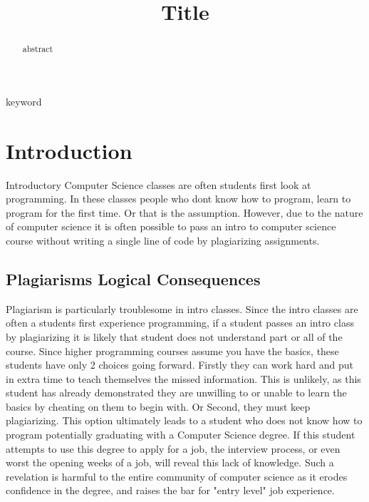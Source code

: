 \documentclass[conference]{IEEEtran}
\begin{document}
\makeatletter
\newlength{\logoheight}
\setlength{\logoheight}{50pt} %

    

\title{
    \textbf{Title}}

\author{
}

\maketitle

\begin{abstract}
abstract
\end{abstract}

\begin{IEEEkeywords}
keyword
\end{IEEEkeywords}

\section{\textbf{Introduction}}
	Introductory Computer Science classes are often students first look at programming.  In these classes people who dont know how to program, learn to program for the first time.  Or that is the assumption.  However, due to the nature of computer science it is often possible to pass an intro to computer science course without writing a single line of code by plagiarizing assignments.
	\subsection{Plagiarisms Logical Consequences}
		Plagiarism is particularly troublesome in intro classes.  Since the intro classes are often a students first experience programming, if a student passes an intro class by plagiarizing it is likely that student does not understand part or all of the course.  Since higher programming courses assume you have the basics, these students have only 2 choices going forward.  Firstly they can work hard and put in extra time to teach themselves the missed information.  This is unlikely, as this student has already demonstrated they are unwilling to or unable to learn the basics by cheating on them to begin with.
		Or Second, they must keep plagiarizing.  This option ultimately leads to a student who does not know how to program potentially graduating with a Computer Science degree.  If this student attempts to use this degree to apply for a job, the interview process, or even worst the opening weeks of a job, will reveal this lack of knowledge.  Such a revelation is harmful to the entire community of computer science as it erodes confidence in the degree, and raises the bar for "entry level" job experience.
\end{document}
